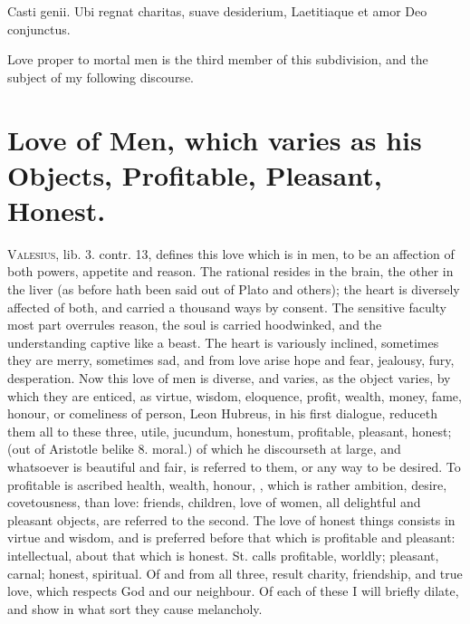 {Casti genii.
Ubi regnat charitas, suave desiderium,
Laetitiaque et amor Deo conjunctus.

Love proper to mortal men is the third member of this subdivision, and
the subject of my following discourse.


\section[Love of Men]{Love of Men, which varies as his Objects, Profitable, Pleasant, Honest.}

\lettrine{V}{alesius}, lib. 3. contr. 13, defines this love which is in men, to be
an affection of both powers, appetite and reason. The rational
resides in the brain, the other in the liver (as before hath been said
out of Plato and others); the heart is diversely affected of both, and
carried a thousand ways by consent. The sensitive faculty most part
overrules reason, the soul is carried hoodwinked, and the understanding
captive like a beast. The heart is variously inclined, sometimes
they are merry, sometimes sad, and from love arise hope and fear,
jealousy, fury, desperation. Now this love of men is diverse, and
varies, as the object varies, by which they are enticed, as virtue,
wisdom, eloquence, profit, wealth, money, fame, honour, or comeliness
of person, \etc{} Leon Hubreus, in his first dialogue, reduceth them all
to these three, utile, jucundum, honestum, profitable, pleasant,
honest; (out of Aristotle belike 8. moral.) of which he discourseth at
large, and whatsoever is beautiful and fair, is referred to them, or
any way to be desired. To profitable is ascribed health, wealth,
honour, \etc{}, which is rather ambition, desire, covetousness, than love:
friends, children, love of women, all delightful and pleasant
objects, are referred to the second. The love of honest things consists
in virtue and wisdom, and is preferred before that which is profitable
and pleasant: intellectual, about that which is honest. St.
\Austin{} calls profitable, worldly; pleasant, carnal; honest, spiritual.
Of and from all three, result charity, friendship, and true love,
which respects God and our neighbour. Of each of these I will briefly
dilate, and show in what sort they cause melancholy.

}
